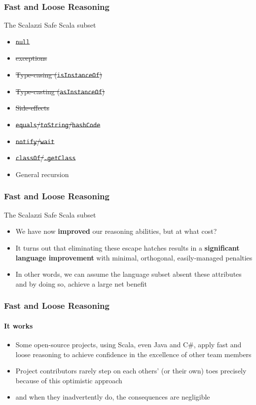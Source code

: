 \begin{frame}[fragile]
\frametitle{Fast and Loose Reasoning}
\begin{block}{The Scalazzi Safe Scala subset}
\begin{itemize}
  \item \sout{\lstinline{null}}
  \item \sout{exceptions}
  \item \sout{Type-casing (\lstinline{isInstanceOf})}
  \item \sout{Type-casting (\lstinline{asInstanceOf})}
  \item \sout{Side-effects}
  \item \sout{\lstinline{equals}/\lstinline{toString}/\lstinline{hashCode}}
  \item \sout{\lstinline{notify}/\lstinline{wait}}
  \item \sout{\lstinline{classOf}/\lstinline{.getClass}}
  \item General recursion
\end{itemize}
\end{block}
\end{frame}

\begin{frame}[fragile]
\frametitle{Fast and Loose Reasoning}
\begin{block}{The Scalazzi Safe Scala subset}
\begin{itemize}
  \item<1> We have now \textbf{improved} our reasoning abilities, but at what cost?
  \item<2> It turns out that eliminating these escape hatches results in a \textbf{significant language improvement} with minimal, orthogonal, easily-managed penalties
  \item<3> In other words, we can assume the language subset absent these attributes and by doing so, achieve a large net benefit
\end{itemize}
\end{block}
\end{frame}

\begin{frame}[fragile]
\frametitle{Fast and Loose Reasoning}
\framesubtitle{It works}
\begin{itemize}
  \item<1> Some open-source projects, using Scala, even Java and C\#, apply fast and loose reasoning to achieve confidence in the excellence of other team members
  \item<2> Project contributors rarely step on each others' (or their own) toes precisely because of this optimistic approach
  \item<3> and when they inadvertently do, the consequences are negligible
\end{itemize}
\end{frame}

